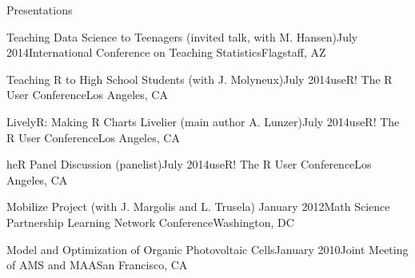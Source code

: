 \documentclass{resume} %
\begin{document}
\begin{rSection}{Presentations}
\begin{sSubsection}{Teaching Data Science to Teenagers}{ (invited talk, with M. Hansen)}{July 2014}{International Conference on Teaching Statistics}{Flagstaff, AZ}
\end{sSubsection}

\begin{sSubsection}{Teaching R to High School Students}{ (with J. Molyneux)}{July 2014}{useR! The R User Conference}{Los Angeles, CA}
\end{sSubsection}

\begin{sSubsection}{LivelyR: Making R Charts Livelier}{ (main author A. Lunzer)}{July 2014}{useR! The R User Conference}{Los Angeles, CA}
\end{sSubsection}

\begin{sSubsection}{heR Panel Discussion}{ (panelist)}{July 2014}{useR! The R User Conference}{Los Angeles, CA}
\end{sSubsection}

\begin{sSubsection}{Mobilize Project}{ (with J. Margolis and L. Trusela)} {January 2012}{Math Science Partnership Learning Network Conference}{Washington, DC}
\end{sSubsection}

\begin{sSubsection}{Model and Optimization of Organic Photovoltaic Cells}{}{January 2010}{Joint Meeting of AMS and MAA}{San Francisco, CA}
\end{sSubsection}
\end{rSection}
\end{document}
